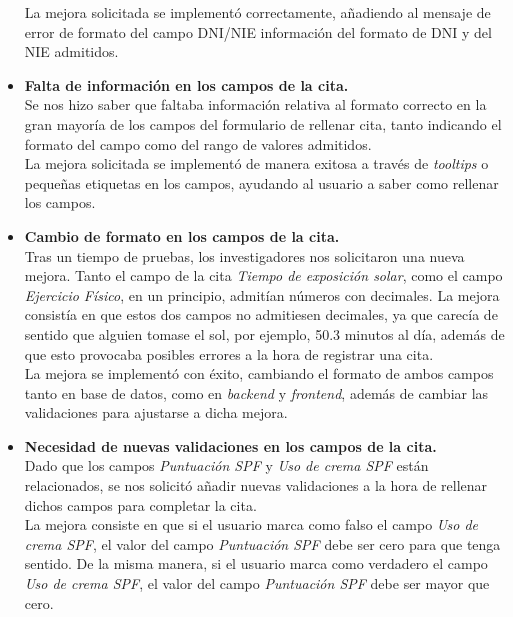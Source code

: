 \begin{itemize}
   La mejora solicitada se implementó correctamente, añadiendo al mensaje de error de formato del campo DNI/NIE información del formato de DNI y del NIE admitidos.
   
    \item\textbf{Falta de información en los campos de la cita.} \\
    Se nos hizo saber que faltaba información relativa al formato correcto en la gran mayoría de los campos del formulario de rellenar cita, tanto indicando el formato del campo como del rango de valores admitidos. \\
    
    La mejora solicitada se implementó de manera exitosa a través de \textit{tooltips} o pequeñas etiquetas en los campos, ayudando al usuario a saber como rellenar los campos.
    
     \item\textbf{Cambio de formato en los campos de la cita.} \\
     Tras un tiempo de pruebas, los investigadores nos solicitaron una nueva mejora. Tanto el campo de la cita \textit{Tiempo de exposición solar}, como el campo \textit{Ejercicio Físico}, en un principio, admitían números con decimales. La mejora consistía en que estos dos campos no admitiesen decimales, ya que carecía de sentido que alguien tomase el sol, por ejemplo, 50.3 minutos al día, además de que esto provocaba posibles errores a la hora de registrar una cita. \\
     
     La mejora se implementó con éxito, cambiando el formato de ambos campos tanto en base de datos, como en \textit{backend} y \textit{frontend}, además de cambiar las validaciones para ajustarse a dicha mejora.
     
      \item\textbf{Necesidad de nuevas validaciones en los campos de la cita.} \\
      Dado que los campos \textit{Puntuación SPF} y \textit{Uso de crema SPF} están relacionados, se nos solicitó añadir nuevas validaciones a la hora de rellenar dichos campos para completar la cita. \\ 
      
      La mejora consiste en que si el usuario marca como falso el campo \textit{Uso de crema SPF}, el valor del campo \textit{Puntuación SPF} debe ser cero para que tenga sentido. De la misma manera, si el usuario marca como verdadero el campo \textit{Uso de crema SPF}, el valor del campo \textit{Puntuación SPF} debe ser mayor que cero.
      

\end{itemize}
